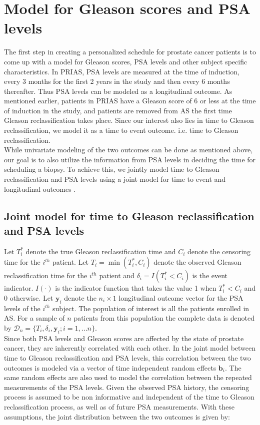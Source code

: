 
\section{Model for Gleason scores and PSA levels}
The first step in creating a personalized schedule for prostate cancer patients is to come up with a model for Gleason scores, PSA levels and other subject specific characteristics. In PRIAS, PSA levels are measured at the time of induction, every 3 months for the first 2 years in the study and then every 6 months thereafter. Thus PSA levels can be modeled as a longitudinal outcome. As mentioned earlier, patients in PRIAS have a Gleason score of 6 or less at the time of induction in the study, and patients are removed from AS the first time Gleason reclassification takes place. Since our interest also lies in time to Gleason reclassification, we model it as a time to event outcome. i.e. time to Gleason reclassification. \\

While univariate modeling of the two outcomes can be done as mentioned above, our goal is to also utilize the information from PSA levels in deciding the time for scheduling a biopsy. To achieve this, we jointly model time to Gleason reclassification and PSA levels using a joint model for time to event and longitudinal outcomes \cite{rizopoulos2012joint}. 

\subsection{Joint model for time to Gleason reclassification and PSA levels}
Let $T_i^*$ denote the true Gleason reclassification time and $C_i$ denote the censoring time for the $i^{th}$ patient. Let $T_i = \min(T_i^*, C_i)$ denote the observed Gleason reclassification time for the $i^{th}$ patient and $\delta_i = I(T_i^* < C_i)$ is the event indicator. $I(\cdot)$ is the indicator function that takes the value 1 when $T_i^* < C_i$ and 0 otherwise. Let $\boldsymbol{y}_i$ denote the $n_i \times 1$ longitudinal outcome vector for the PSA levels of the $i^{th}$ subject. The population of interest is all the patients enrolled in AS. For a sample of $n$ patients from this population the complete data is denoted by $\mathcal{D}_n = \{T_i, \delta_i, \boldsymbol{y}_i; i = 1,...n\}$.\\

Since both PSA levels and Gleason scores are affected by the state of prostate cancer, they are inherently correlated with each other. In the joint model between time to Gleason reclassification and PSA levels, this correlation between the two outcomes is modeled via a vector of time independent random effects $\boldsymbol{b}_i$. The same random effects are also used to model the correlation between the repeated measurements of the PSA levels. Given the observed PSA history, the censoring process is assumed to be non informative and independent of the time to Gleason reclassification process, as well as of future PSA measurements. With these assumptions, the joint distribution between the two outcomes is given by:

